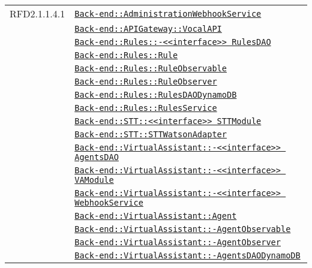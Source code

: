 \begin{longtable}{|>{\centering}m{3cm}|m{10cm}<{\centering}|}
RFD2.1.1.4.1 & \hyperref[Back-end::AdministrationWebhookService]{\texttt{Back-end::AdministrationWebhookService}}\\
& \hyperref[Back-end::APIGateway::VocalAPI]{\texttt{Back-end::APIGateway::VocalAPI}}\\
& \hyperref[Back-end::Rules::<<interface>> RulesDAO]{\texttt{Back-end::Rules::-\linebreak <<interface>> RulesDAO}}\\
& \hyperref[Back-end::Rules::Rule]{\texttt{Back-end::Rules::Rule}}\\
& \hyperref[Back-end::Rules::RuleObservable]{\texttt{Back-end::Rules::RuleObservable}}\\
& \hyperref[Back-end::Rules::RuleObserver]{\texttt{Back-end::Rules::RuleObserver}}\\
& \hyperref[Back-end::Rules::RulesDAODynamoDB]{\texttt{Back-end::Rules::RulesDAODynamoDB}}\\
& \hyperref[Back-end::Rules::RulesService]{\texttt{Back-end::Rules::RulesService}}\\
& \hyperref[Back-end::STT::<<interface>> STTModule]{\texttt{Back-end::STT::<<interface>> STTModule}}\\
& \hyperref[Back-end::STT::STTWatsonAdapter]{\texttt{Back-end::STT::STTWatsonAdapter}}\\
& \hyperref[Back-end::VirtualAssistant::<<interface>> AgentsDAO]{\texttt{Back-end::VirtualAssistant::-\linebreak <<interface>> AgentsDAO}}\\
& \hyperref[Back-end::VirtualAssistant::<<interface>> VAModule]{\texttt{Back-end::VirtualAssistant::-\linebreak <<interface>> VAModule}}\\
& \hyperref[Back-end::VirtualAssistant::<<interface>> WebhookService]{\texttt{Back-end::VirtualAssistant::-\linebreak <<interface>> WebhookService}}\\
& \hyperref[Back-end::VirtualAssistant::Agent]{\texttt{Back-end::VirtualAssistant::Agent}}\\
& \hyperref[Back-end::VirtualAssistant::AgentObservable]{\texttt{Back-end::VirtualAssistant::-\linebreak AgentObservable}}\\
& \hyperref[Back-end::VirtualAssistant::AgentObserver]{\texttt{Back-end::VirtualAssistant::-\linebreak AgentObserver}}\\
& \hyperref[Back-end::VirtualAssistant::AgentsDAODynamoDB]{\texttt{Back-end::VirtualAssistant::-\linebreak AgentsDAODynamoDB}}\\

\end{longtable}
